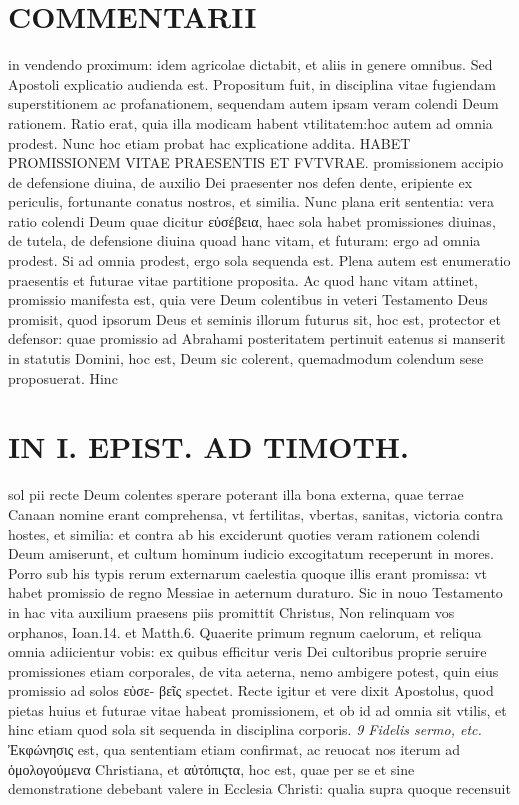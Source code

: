 \documentclass{article}
\begin{document}
\begin{pages}
\section*{COMMENTARII }
\marginpar{[ p.100 ]}\pstart in vendendo proximum: idem agricolae dictabit, et aliis in genere omnibus. Sed Apostoli explicatio audienda est. Propositum fuit, in disciplina vitae fugiendam superstitionem ac profanationem, sequendam autem ipsam veram colendi Deum rationem. Ratio erat, quia illa modicam habent vtilitatem:hoc autem ad omnia prodest. Nunc hoc etiam probat hac explicatione addita. HABET PROMISSIONEM VITAE PRAESENTIS ET FVTVRAE. promissionem accipio de defensione diuina, de auxilio Dei praesenter nos defen dente, eripiente ex periculis, fortunante conatus nostros, et similia. Nunc plana erit sententia: vera ratio colendi Deum quae dicitur εὐσέβεια, haec sola habet promissiones diuinas, de tutela, de defensione diuina quoad hanc vitam, et futuram: ergo ad omnia prodest. Si ad omnia prodest, ergo sola sequenda est. Plena autem est enumeratio praesentis et futurae vitae partitione proposita. Ac quod hanc vitam attinet, promissio manifesta est, quia vere Deum colentibus in veteri Testamento Deus promisit, quod ipsorum Deus et seminis illorum futurus sit, hoc est, protector et defensor: quae promissio ad Abrahami posteritatem pertinuit eatenus si manserit in statutis Domini, hoc est, Deum sic colerent, quemadmodum colendum sese proposuerat. Hinc  \pend
\section*{IN I. EPIST. AD TIMOTH. }
\marginpar{[ p.101 ]}\pstart sol pii recte Deum colentes sperare poterant illa bona externa, quae terrae Canaan nomine erant comprehensa, vt fertilitas, vbertas, sanitas, victoria contra hostes, et similia: et contra ab his exciderunt quoties veram rationem colendi Deum amiserunt, et cultum hominum iudicio excogitatum receperunt in mores. Porro sub his typis rerum externarum caelestia quoque illis erant promissa: vt habet promissio de regno Messiae in aeternum duraturo. Sic in nouo Testamento in hac vita auxilium praesens piis promittit Christus, Non relinquam vos orphanos, Ioan.14. et Matth.6. Quaerite primum regnum caelorum, et reliqua omnia adiicientur vobis: ex quibus efficitur veris Dei cultoribus proprie seruire promissiones etiam corporales, de vita aeterna, nemo ambigere potest, quin eius promissio ad solos εὐσε- βεῖς spectet. Recte igitur et vere dixit Apostolus, quod pietas huius et futurae vitae habeat promissionem, et ob id ad omnia sit vtilis, et hinc etiam quod sola sit sequenda in disciplina corporis.  \pend
\textit{9 Fidelis sermo, etc. }\pstart Ἐκφώνησις est, qua sententiam etiam confirmat, ac reuocat nos iterum ad ὁμολογούμενα Christiana, et αὐτόπιςτα, hoc est, quae per se et sine demonstratione debebant valere in Ecclesia Christi: qualia supra quoque recensuit  \pend

\end{pages}
\end{document}
